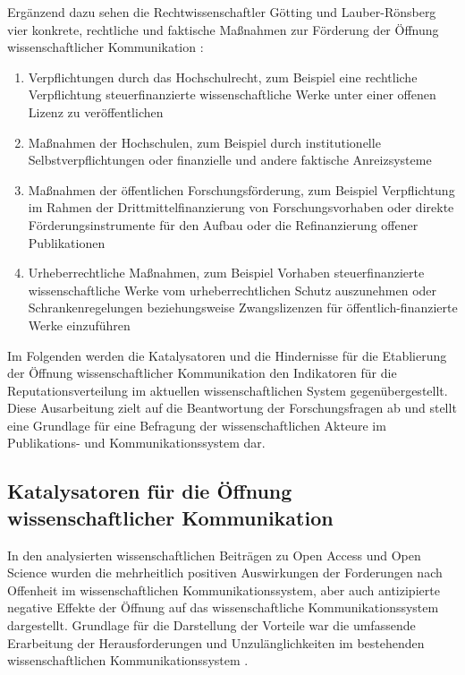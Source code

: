 Ergänzend dazu sehen die Rechtwissenschaftler Götting und Lauber-Rönsberg vier konkrete, rechtliche und faktische Maßnahmen zur Förderung der Öffnung wissenschaftlicher Kommunikation \cite[:138]{Goetting_2015}:
\begin{enumerate}
\item Verpflichtungen durch das Hochschulrecht, zum Beispiel eine rechtliche Verpflichtung steuerfinanzierte wissenschaftliche Werke unter einer offenen Lizenz zu veröffentlichen
\item Maßnahmen der Hochschulen, zum Beispiel durch institutionelle Selbstverpflichtungen oder finanzielle und andere faktische Anreizsysteme
\item Maßnahmen der öffentlichen Forschungsförderung, zum Beispiel Verpflichtung im Rahmen der Drittmittelfinanzierung von Forschungsvorhaben oder direkte Förderungsinstrumente für den Aufbau oder die Refinanzierung offener Publikationen
\item Urheberrechtliche Maßnahmen, zum Beispiel Vorhaben steuerfinanzierte wissenschaftliche Werke vom urheberrechtlichen Schutz auszunehmen oder Schrankenregelungen beziehungsweise Zwangslizenzen für öffentlich-finanzierte Werke einzuführen
\end{enumerate}

Im Folgenden werden die Katalysatoren und die Hindernisse für die Etablierung der Öffnung wissenschaftlicher Kommunikation den Indikatoren für die Reputationsverteilung im aktuellen wissenschaftlichen System gegenübergestellt. Diese Ausarbeitung zielt auf die Beantwortung der Forschungsfragen ab und stellt eine Grundlage für eine Befragung der wissenschaftlichen Akteure im Publikations- und Kommunikationssystem dar.

\subsection{Katalysatoren für die Öffnung wissenschaftlicher Kommunikation}

In den analysierten wissenschaftlichen Beiträgen zu Open Access und Open Science wurden die mehrheitlich positiven Auswirkungen der Forderungen nach Offenheit im wissenschaftlichen Kommunikationssystem, aber auch antizipierte negative Effekte der Öffnung auf das wissenschaftliche Kommunikationssystem dargestellt. Grundlage für die Darstellung der Vorteile war die umfassende Erarbeitung der Herausforderungen und Unzulänglichkeiten im bestehenden wissenschaftlichen Kommunikationssystem \cite{Herb_2012a}.

